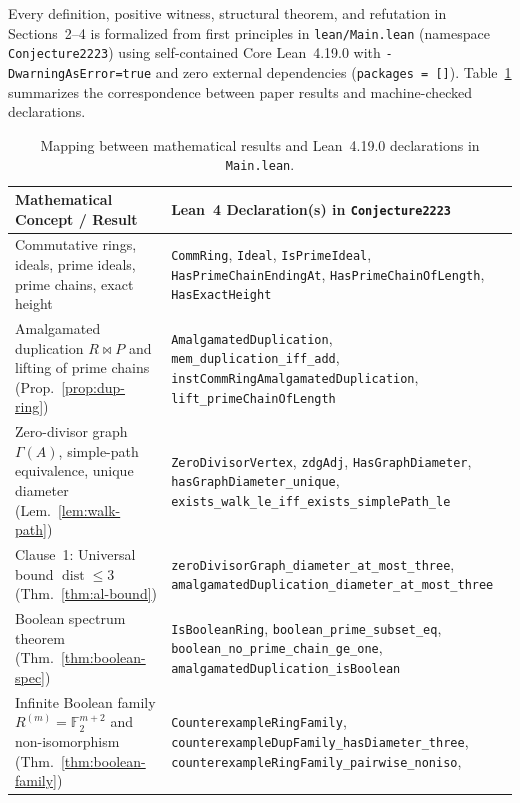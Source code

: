 \documentclass[11pt]{article}
\theoremstyle{definition}
\newcommand{\dist}{\operatorname{dist}}
\newcommand{\FF}{\mathbb{F}}
\begin{document}
Every definition, positive witness, structural theorem, and refutation in Sections~2--4 is
formalized from first principles in \texttt{lean/Main.lean} (namespace
\texttt{Conjecture2223}) using self-contained Core Lean~4.19.0 with
\texttt{-DwarningAsError=true} and zero external dependencies (\texttt{packages = []}).
Table~\ref{tab:lean-map} summarizes the correspondence between paper results and
machine-checked declarations.

\begin{table}[htbp]
\centering
\caption{Mapping between mathematical results and Lean~4.19.0 declarations in \texttt{Main.lean}.}\label{tab:lean-map}
\smallskip
\footnotesize
\begin{tabular}{@{}>{\raggedright\arraybackslash}p{}>{\raggedright\arraybackslash}p{}@{}}
\toprule
Mathematical Concept / Result & Lean~4 Declaration(s) in \texttt{Conjecture2223} \\
\midrule
Commutative rings, ideals, prime ideals, prime chains, exact height &
\texttt{CommRing}, \texttt{Ideal}, \texttt{IsPrimeIdeal}, \texttt{HasPrimeChainEndingAt},
\texttt{HasPrimeChainOfLength}, \texttt{HasExactHeight} \\
\addlinespace[3pt]
Amalgamated duplication $R \bowtie P$ and lifting of prime chains (Prop.~\ref{prop:dup-ring}) &
\texttt{AmalgamatedDuplication}, \texttt{mem\_duplication\_iff\_add},
\texttt{instCommRingAmalgamatedDuplication}, \texttt{lift\_primeChainOfLength} \\
\addlinespace[3pt]
Zero-divisor graph $\Gamma(A)$, simple-path equivalence, unique diameter (Lem.~\ref{lem:walk-path}) &
\texttt{ZeroDivisorVertex}, \texttt{zdgAdj}, \texttt{HasGraphDiameter},
\texttt{hasGraphDiameter\_unique}, \texttt{exists\_walk\_le\_iff\_exists\_simplePath\_le} \\
\addlinespace[3pt]
Clause~1: Universal bound $\dist \le 3$ (Thm.~\ref{thm:al-bound}) &
\texttt{zeroDivisorGraph\_diameter\_at\_most\_three},
\texttt{amalgamatedDuplication\_diameter\_at\_most\_three} \\
\addlinespace[3pt]
Boolean spectrum theorem (Thm.~\ref{thm:boolean-spec}) &
\texttt{IsBooleanRing}, \texttt{boolean\_prime\_subset\_eq},
\texttt{boolean\_no\_prime\_chain\_ge\_one}, \texttt{amalgamatedDuplication\_isBoolean} \\
\addlinespace[3pt]
Infinite Boolean family $R^{(m)} = \FF_2^{m+2}$ and non-isomorphism (Thm.~\ref{thm:boolean-family}) &
\texttt{CounterexampleRingFamily}, \texttt{counterexampleDupFamily\_hasDiameter\_three},
\texttt{counterexampleRingFamily\_pairwise\_noniso},

\end{tabular}
\end{table}
\end{document}
